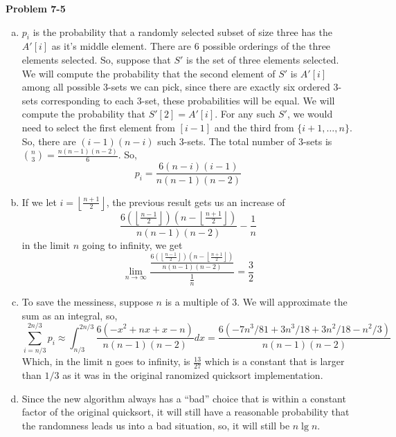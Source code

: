 \documentclass{article}
\begin{document}
\noindent\textbf{Problem 7-5}\\
\begin{enumerate}[a.]
\item
$p_i$ is the probability that a randomly selected subset of size three has the $A'[i]$ as it's middle element. There are $6$ possible orderings of the three elements selected. So, suppose that $S'$ is the set of three elements selected. We will compute the probability that the second element of $S'$ is $A'[i]$ among all possible 3-sets we can pick, since there are exactly six ordered 3-sets corresponding to each 3-set, these probabilities will be equal. We will compute the probability that $S'[2] = A'[i]$. For any such $S'$, we would need to select the first element from $[i-1]$ and the third from $\{i+1,\ldots,n\}$. So, there are $(i-1)(n-i)$ such 3-sets. The total number of 3-sets is $\binom{n}{3} = \frac{n(n-1)(n-2)}{6}$. So, 
\[
p_i = \frac{6(n-i)(i-1)}{n(n-1)(n-2)}
\]

\item
If we let $i = \left\lfloor \frac{n+1}{2}\right\rfloor$, the previous result gets us an increase of 
\[
\frac{6(\left\lfloor\frac{n-1}{2}\right\rfloor)(n -\left\lfloor \frac{n+1}{2}\right\rfloor)}{n(n-1)(n-2)} - \frac{1}{n}
\]
in the limit $n$ going to infinity, we get
\[
\lim_{n\rightarrow \infty} \frac{\frac{6(\left\lfloor\frac{n-1}{2}\right\rfloor)(n -\left\lfloor \frac{n+1}{2}\right\rfloor)}{n(n-1)(n-2)}}{\frac{1}{n}} = \frac{3}{2}
\]

\item

To save the messiness, suppose $n$ is a multiple of 3. We will approximate the sum as an integral, so, 
\[
\sum_{i=n/3}^{2n/3} p_i \approx \int_{n/3}^{2n/3} \frac{6(-x^2+nx+x-n)}{n(n-1)(n-2)}dx = \frac{6(-7n^3/81 + 3n^3/18 + 3n^2/18- n^2/3)}{n(n-1)(n-2)}
\]
Which, in the limit n goes to infinity, is $\frac{13}{27}$ which is a constant that is larger than $1/3$ as it was in the original ranomized quicksort implementation.

\item
Since the new algorithm always has a ``bad'' choice that is within a constant factor of the original quicksort, it will still have a reasonable probability that the randomness leads us into a bad situation, so, it will still be $n\lg n$.
\end{enumerate}
\end{document}
